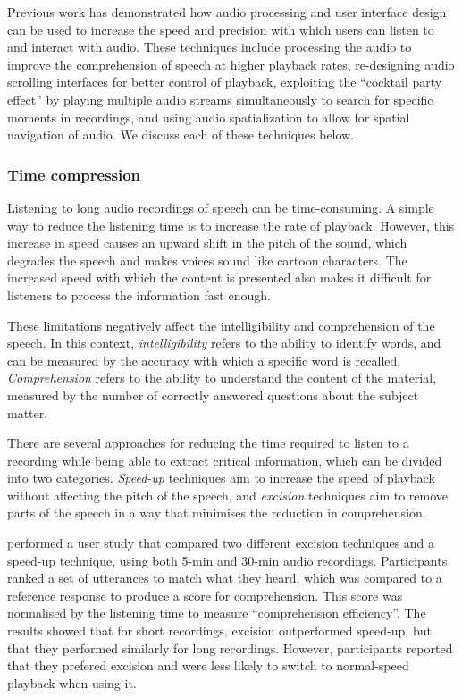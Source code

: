 Previous work has demonstrated how audio processing and user interface design can be used to increase the speed and
precision with which users can listen to and interact with audio. These techniques include processing the audio to
improve the comprehension of speech at higher playback rates, re-designing audio scrolling interfaces for better
control of playback, exploiting the ``cocktail party effect'' by playing multiple audio streams simultaneously to
search for specific moments in recordings, and using audio spatialization to allow for spatial navigation of audio. We
discuss each of these techniques below.

\subsubsection{Time compression}

Listening to long audio recordings of speech can be time-consuming. A simple way to reduce the listening time is to
increase the rate of playback.  However, this increase in speed causes an upward shift in the pitch of the sound, which
degrades the speech and makes voices sound like cartoon characters.  The increased speed with which the content is
presented also makes it difficult for listeners to process the information fast enough.

These limitations negatively affect the intelligibility and comprehension of the speech.  In this context,
\textit{intelligibility} refers to the ability to identify words, and can be measured by the accuracy with which a
specific word is recalled. \textit{Comprehension} refers to the ability to understand the content of the material,
measured by the number of correctly answered questions about the subject matter.


There are several approaches for reducing the time required to listen to a recording while being able to extract
critical information, which can be divided into two categories.  \textit{Speed-up} techniques aim to increase the speed
of playback without affecting the pitch of the speech, and \textit{excision} techniques aim to remove parts of the
speech in a way that minimises the reduction in comprehension.

\citet{Tucker2006} performed a user study that compared two different excision techniques and a speed-up technique,
using both 5-min and 30-min audio recordings.  Participants ranked a set of utterances to match what they heard,
which was compared to a reference response to produce a score for comprehension. This score was normalised by the
listening time to measure ``comprehension efficiency''.  The results showed that for short recordings, excision
outperformed speed-up, but that they performed similarly for long recordings. However, participants reported that they
prefered excision and were less likely to switch to normal-speed playback when using it.

